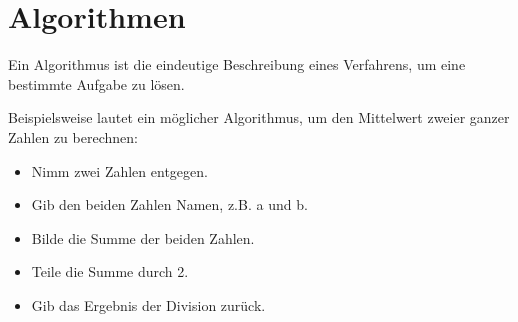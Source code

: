 \section{Algorithmen}

Ein Algorithmus ist die eindeutige Beschreibung eines Verfahrens, um eine bestimmte Aufgabe zu lösen.

Beispielsweise lautet ein möglicher Algorithmus, um den Mittelwert zweier ganzer Zahlen zu berechnen:
\begin{itemize}
	\item Nimm zwei Zahlen entgegen.
	\item Gib den beiden Zahlen Namen, z.B. a und b.
	\item Bilde die Summe der beiden Zahlen.
	\item Teile die Summe durch 2.
	\item Gib das Ergebnis der Division zurück.
\end{itemize} 